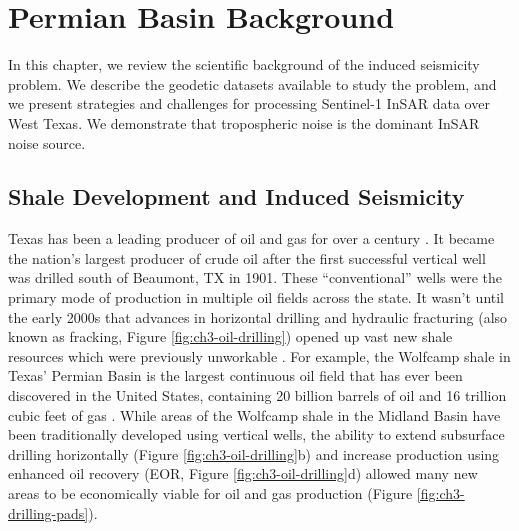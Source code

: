 
\chapter{Permian Basin Background}
\label{CHAP:3}



In this chapter, we review the scientific background of the induced seismicity problem.
We describe the geodetic datasets available to study the problem, and we present strategies and challenges for processing Sentinel-1 InSAR data over West Texas. We demonstrate that tropospheric noise is the dominant InSAR noise source.


\section{Shale Development and Induced Seismicity}
\label{sec:ch3-oil}

Texas has been a leading producer of oil and gas for over a century \citep{Frohlich2016HistoricalReviewInduced, TheAcademyofMedicine2017EnvironmentalCommunityImpacts}. It became the nation's largest producer of crude oil after the first successful vertical well was drilled south of Beaumont, TX in 1901. These ``conventional'' wells were the primary mode of production in multiple oil fields across the state. It wasn't until the early 2000s that advances in horizontal drilling and hydraulic fracturing (also known as fracking, Figure \ref{fig:ch3-oil-drilling}) opened up vast new shale resources which were previously unworkable \citep{Waters2006Spe103202Ms}. 
For example, the Wolfcamp shale in Texas' Permian Basin is the largest continuous oil field that has ever been discovered in the United States, containing 20 billion barrels of oil and 16 trillion cubic feet of gas \citep{Gaswirth2016AssessmentUndiscoveredContinuous}. While areas of the Wolfcamp shale in the Midland Basin have been traditionally developed using vertical wells, the ability to extend subsurface drilling horizontally (Figure \ref{fig:ch3-oil-drilling}b) and increase production using enhanced oil recovery (EOR, Figure \ref{fig:ch3-oil-drilling}d)
allowed many new areas to be economically viable for oil and gas production (Figure \ref{fig:ch3-drilling-pads}).




